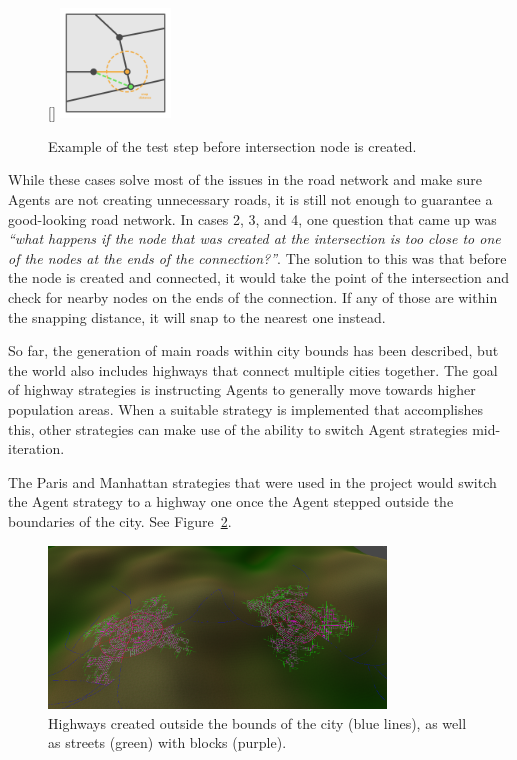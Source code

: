 \begin{figure}
  \centering
  \raisebox{0pt}[\dimexpr{}\baselineskip\relax]{
    \includegraphics[width=0.26\textwidth]{figure/road_intersection_final_test.png}
  }
  \caption{Example of the test step before intersection node is created.}

  \label{fig:road_intersection_final_test}
\end{figure}

While these cases solve most of the issues in the road network and make sure Agents are not creating unnecessary roads, it is still not enough to guarantee a good-looking road network.
In cases 2, 3, and 4, one question that came up was \textit{``what happens if the node that was created at the intersection is too close to one of the nodes at the ends of the connection?''}.
The solution to this was that before the node is created and connected, it would take the point of the intersection and check for nearby nodes on the ends of the connection.
If any of those are within the snapping distance, it will snap to the nearest one instead.


So far, the generation of main roads within city bounds has been described, but the world also includes highways that connect multiple cities together.
The goal of highway strategies is instructing Agents to generally move towards higher population areas.
When a suitable strategy is implemented that accomplishes this, other strategies can make use of the ability to switch Agent strategies mid-iteration.

The Paris and Manhattan strategies that were used in the project would switch the Agent strategy to a highway one once the Agent stepped outside the boundaries of the city.
See Figure~\ref{fig:road_highways}.

\begin{figure}[H]
  \centering

  \includegraphics[width=0.8\textwidth]{figure/road_highways.png}
  \caption{Highways created outside the bounds of the city (blue lines), as well as streets (green) with blocks (purple).}

  \label{fig:road_highways}
\end{figure}

